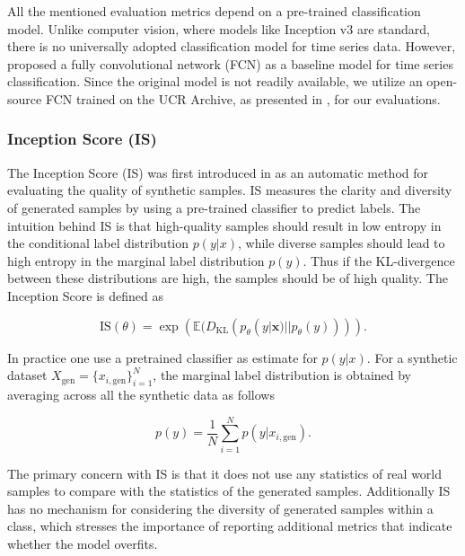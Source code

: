 \documentclass[../../thesis.tex]{subfiles}
\begin{document}
All the mentioned evaluation metrics depend on a pre-trained classification model. Unlike computer vision, where models like Inception v3 are standard, there is no universally adopted classification model for time series data. However, \cite{wang2016time} proposed a fully convolutional network (FCN) as a baseline model for time series classification. Since the original model is not readily available, we utilize an open-source FCN trained on the UCR Archive, as presented in \cite{TimeVQVAE}, for our evaluations.

\subsubsection{Inception Score (IS)}

The Inception Score (IS) was first introduced in \cite{salimans2016improved} as an automatic method for evaluating the quality of synthetic samples. IS measures the clarity and diversity of generated samples by using a pre-trained classifier to predict labels. The intuition behind IS is that high-quality samples should result in low entropy in the conditional label distribution $p(y|x)$, while diverse samples should lead to high entropy in the marginal label distribution $p(y)$. Thus if the KL-divergence between these distributions are high, the samples should be of high quality. The Inception Score is defined as 

\begin{equation}
    \label{IS}
    {\text{IS}}(\theta) = \exp\left( \mathbb{E}(D_{\text{KL}}(p_\theta(y|\mathbf{x}) || p_\theta(y))) \right).
\end{equation}


In practice one use a pretrained classifier as estimate for $p(y|x)$. For a synthetic dataset $X_{\text{gen}} = \{x_{i,\text{gen}}\}_{i=1}^N$, the marginal label distribution is obtained by averaging across all the synthetic data as follows

\[
    p(y) = \frac{1}{N} \sum_{i=1}^N p(y |x_{i,\text{gen}}).
\]

The primary concern with IS is that it does not use any statistics of real world samples to compare with the statistics of the generated samples. Additionally IS has no mechanism for considering the diversity of generated samples within a class, which stresses the importance of reporting additional metrics that indicate whether the model overfits. 
\end{document}
